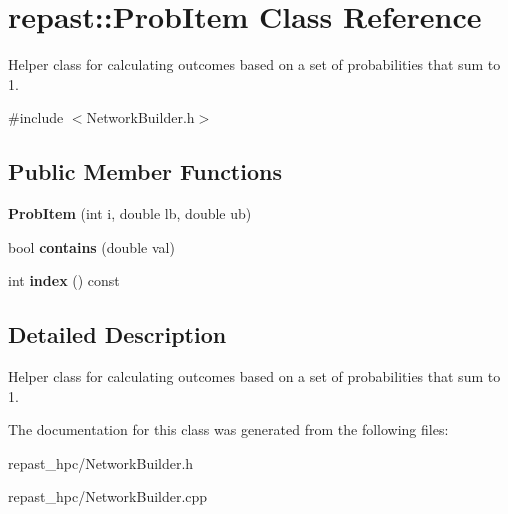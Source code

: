\hypertarget{classrepast_1_1_prob_item}{\section{repast\-:\-:Prob\-Item Class Reference}
\label{classrepast_1_1_prob_item}
}


Helper class for calculating outcomes based on a set of probabilities that sum to 1.  




{\ttfamily \#include $<$Network\-Builder.\-h$>$}

\subsection*{Public Member Functions}
\begin{DoxyCompactItemize}
\item 
\hypertarget{classrepast_1_1_prob_item_ae40fde5da262714602d99b006ed2bedd}{{\bfseries Prob\-Item} (int i, double lb, double ub)}\label{classrepast_1_1_prob_item_ae40fde5da262714602d99b006ed2bedd}

\item 
\hypertarget{classrepast_1_1_prob_item_a5fce5b58f3bf91f429b12e36be97056e}{bool {\bfseries contains} (double val)}\label{classrepast_1_1_prob_item_a5fce5b58f3bf91f429b12e36be97056e}

\item 
\hypertarget{classrepast_1_1_prob_item_ac810de8aae7b756cc74f0c6c394c7dcf}{int {\bfseries index} () const }\label{classrepast_1_1_prob_item_ac810de8aae7b756cc74f0c6c394c7dcf}

\end{DoxyCompactItemize}


\subsection{Detailed Description}
Helper class for calculating outcomes based on a set of probabilities that sum to 1. 

The documentation for this class was generated from the following files\-:\begin{DoxyCompactItemize}
\item 
repast\-\_\-hpc/Network\-Builder.\-h\item 
repast\-\_\-hpc/Network\-Builder.\-cpp\end{DoxyCompactItemize}
